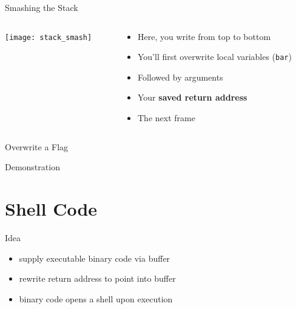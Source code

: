 \documentclass[beamer]{uibk}
\begin{document}
\begin{frame}{Smashing the Stack}
    \begin{columns}
        \begin{column}{0.5\textwidth}
            \begin{center}
                \texttt{[image: stack\_smash]}
            \end{center}
        \end{column}
        \begin{column}{0.5\textwidth}
            \begin{itemize}
                \item Here, you write from top to bottom \bigskip
                \item You'll first overwrite local variables (\texttt{bar}) \bigskip
                \item Followed by arguments \bigskip
                \item Your \textbf{saved return address} \bigskip
                \item The next frame
            \end{itemize}
        \end{column}
    \end{columns}
\end{frame}

\begin{frame}{Overwrite a Flag}
    \begin{center}
        \huge Demonstration
    \end{center}
\end{frame}

\section{Shell Code}

\begin{frame}{Idea}
    \begin{itemize}
        \item supply executable binary code via buffer
        \medskip
        \item rewrite return address to point into buffer
        \medskip
        \item binary code opens a shell upon execution
    \end{itemize}
\end{frame}
\end{document}

